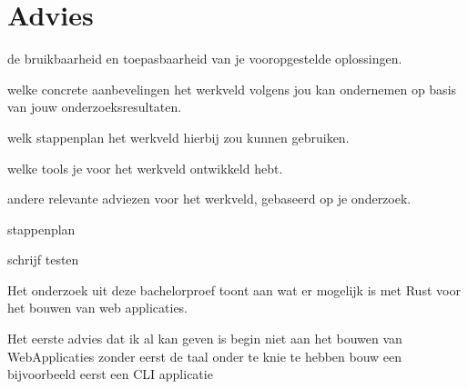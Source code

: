 \chapter{Advies}

de bruikbaarheid en toepasbaarheid van je vooropgestelde oplossingen.

welke concrete aanbevelingen het werkveld volgens jou kan ondernemen op basis van jouw onderzoeksresultaten.

welk stappenplan het werkveld hierbij zou kunnen gebruiken.

welke tools je voor het werkveld ontwikkeld hebt.

andere relevante adviezen voor het werkveld, gebaseerd op je onderzoek.


stappenplan

schrijf testen




Het onderzoek uit deze bachelorproef toont aan wat er mogelijk is met Rust voor het bouwen van web
applicaties.

Het eerste advies dat ik al kan geven is begin niet aan het bouwen van WebApplicaties zonder eerst
de taal onder te knie te hebben
bouw een bijvoorbeeld eerst een CLI applicatie
